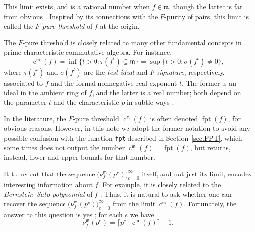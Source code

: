 \documentclass{amsart}
\newcommand{\ft}{\operatorname{c}}
\newcommand{\idealm}{\mathfrak{m}}
\DeclareMathOperator{\fpt}{fpt}
\begin{document}
This limit exists, and is a rational number when $f\in \idealm$, though the latter is far from obvious  \cite{BlickleMustataSmithDiscretenessAndRationalityOfFThresholds}.
Inspired by its connections with the $F$-purity of pairs,  this limit is called the \emph{$F$-pure threshold} of $f$ at the origin.

The $F$-pure threshold is closely related to many other fundamental concepts in prime characteristic commutative algebra.   For instance,
\[ \ft^{\idealm}(f) = \inf \{ t>0 : \tau(f^t)  \subseteq \idealm \} = \sup \{ t>0 : \sigma( f^t) \neq 0 \}, \]
where $\tau(f^t)$ and $\sigma(f^t)$ are the \emph{test ideal} and \emph{$F$-signature}, respectively, associated to $f$ and the formal nonnegative real exponent $t$.  The former is an ideal in the ambient ring of $f$, and the latter is a real number;  both depend on the parameter $t$ and the characteristic $p$ in subtle ways \cite{BlickleMustataSmithDiscretenessAndRationalityOfFThresholds, BlickleSchwedeTuckerFSigPairs1}.

In the literature, the $F$-pure threshold $\ft^{\idealm}(f)$ is often denoted $\fpt(f)$, for obvious reasons.
However, in this note we adopt the former notation to avoid any possible confusion with the function \texttt{fpt} described in Section~\ref{sec.FPT}, which some times does not output the number $\ft^{\idealm}(f) = \fpt(f)$, but returns, instead, lower and upper bounds for that number.

It turns out that the sequence $\big(\nu_f^{\idealm}(p^e) \big)_{e=0}^{\infty}$ itself, and not just its limit, encodes interesting information about $f$.  For example, it is closely related to the \emph{Bernstein--Sato polynomial} of $f$ \cite{MustataTakagiWatanabeFThresholdsAndBernsteinSato}.  Thus, it is natural to ask whether one can recover the sequence $\big( \nu_f^{\idealm}(p^e) \big)_{e=0}^{\infty}$ from the limit $\ft^{\idealm}(f)$.  Fortunately, the answer to this question is yes \cite{MustataTakagiWatanabeFThresholdsAndBernsteinSato, HernandezFPurityOfHypersurfaces}; for each $e$ we have
\begin{equation*}
\nu_f^{\idealm}(p^e) = \lceil p^e \cdot \ft^{\idealm}(f) \rceil - 1.
\end{equation*}
\end{document}
